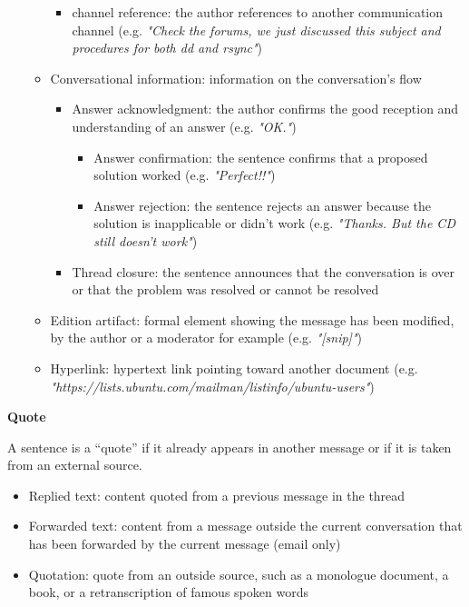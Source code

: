 \documentclass[11pt]{article}
\begin{document}
\begin{itemize}
\begin{itemize}
\begin{itemize}
					\item channel reference: the author references to another communication channel (e.g. \textit{"Check the forums, we just discussed this subject and procedures for both dd and rsync"})
				\end{itemize}
			\item Conversational information: information on the conversation's flow
				\begin{itemize}
					\item Answer acknowledgment: the author confirms the good reception and understanding of an answer (e.g. \textit{"OK."})
						\begin{itemize}
							\item Answer confirmation: the sentence confirms that a proposed solution worked (e.g. \textit{"Perfect!!"})
							\item Answer rejection: the sentence rejects an answer because the solution is inapplicable or didn't work (e.g. \textit{"Thanks. But the CD still doesn't work"})
						\end{itemize}
					\item Thread closure: the sentence announces that the conversation is over or that the problem was resolved or cannot be resolved
				\end{itemize}
			\item Edition artifact: formal element showing the message has been modified, by the author or a moderator for example (e.g. \textit{"[snip]"})
			\item Hyperlink: hypertext link pointing toward another document (e.g. \textit{"https://lists.ubuntu.com/mailman/listinfo/ubuntu-users"})
		\end{itemize}
\end{itemize}

\textbf{Quote}
\vspace{0.1cm}

A sentence is a ``quote'' if it already appears in another message or if it is taken from an external source.

\begin{itemize}
	\item Replied text: content quoted from a previous message in the thread
	\item Forwarded text: content from a message outside the current conversation that has been forwarded by the current message (email only)
	\item Quotation: quote from an outside source, such as a monologue document, a book, or a retranscription of famous spoken words
\end{itemize}
\end{document}
